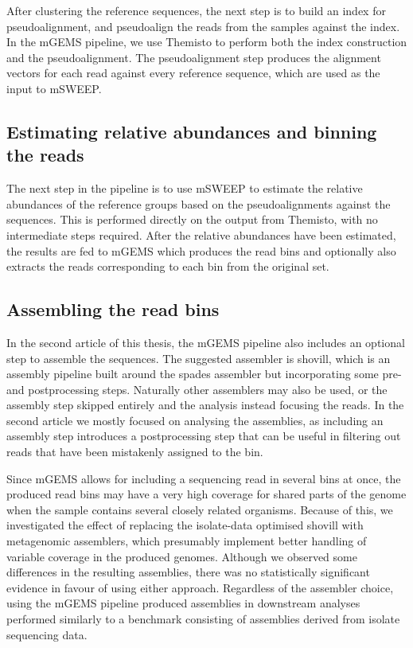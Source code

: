 \documentclass[officiallayout]{tktla}
\begin{document}
After clustering the reference sequences, the next step is to build an
index for pseudoalignment, and pseudoalign the reads from the samples
against the index. In the mGEMS pipeline, we use Themisto to perform
both the index construction and the pseudoalignment. The
pseudoalignment step produces the alignment vectors for each read
against every reference sequence, which are used as the input to
mSWEEP.

\subsection{Estimating relative abundances and binning the reads}

The next step in the pipeline is to use mSWEEP to estimate the
relative abundances of the reference groups based on the
pseudoalignments against the sequences. This is performed directly on
the output from Themisto, with no intermediate steps required. After
the relative abundances have been estimated, the results are fed to
mGEMS which produces the read bins and optionally also extracts the
reads corresponding to each bin from the original set.


\subsection{Assembling the read bins}

In the second article of this thesis, the mGEMS pipeline also includes
an optional step to assemble the sequences. The suggested assembler is
shovill, which is an assembly pipeline built around the spades
assembler but incorporating some pre- and postprocessing
steps. Naturally other assemblers may also be used, or the assembly
step skipped entirely and the analysis instead focusing the reads. In
the second article we mostly focused on analysing the assemblies, as
including an assembly step introduces a postprocessing step that can
be useful in filtering out reads that have been mistakenly assigned to
the bin.

Since mGEMS allows for including a sequencing read in several bins at
once, the produced read bins may have a very high coverage for shared
parts of the genome when the sample contains several closely related
organisms. Because of this, we investigated the effect of replacing
the isolate-data optimised shovill with metagenomic assemblers, which
presumably implement better handling of variable coverage in the
produced genomes. Although we observed some differences in the
resulting assemblies, there was no statistically significant evidence
in favour of using either approach. Regardless of the assembler
choice, using the mGEMS pipeline produced assemblies in downstream
analyses performed similarly to a benchmark consisting of assemblies
derived from isolate sequencing data.
\end{document}
